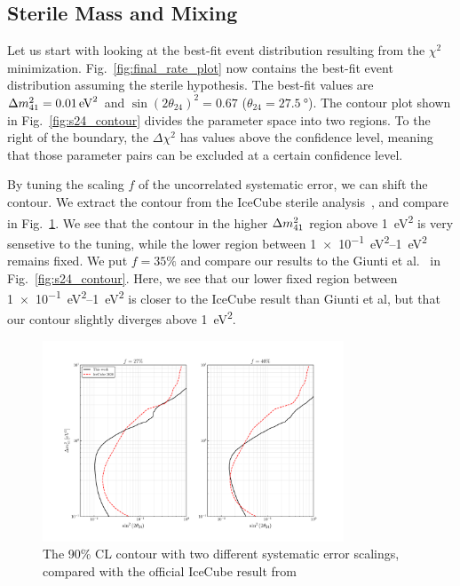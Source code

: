 \subsection{Sterile Mass and Mixing}
Let us start with looking at the best-fit event distribution resulting from the $\chi^2$ minimization.
Fig.~\ref{fig:final_rate_plot} now contains the best-fit event distribution assuming the sterile hypothesis.
The best-fit values are $\dm[41] = \SI{0.01}{\eV\squared}$ and 
$\sin(2\theta_{24})^2 = 0.67$ ($\theta_{24} = \SI{27.5}{\degree}$). %
The contour plot shown in Fig.~\ref{fig:s24_contour} divides the parameter space into two regions.
To the right of the boundary, the $\Delta \chi^2$ has values above the confidence level, meaning that 
those parameter pairs can be excluded at a certain confidence level.

By tuning the scaling $f$ of the uncorrelated systematic error, we can shift the contour. We extract the contour from the 
IceCube sterile analysis~\cite{IC2020}, and compare in Fig.~\ref{fig:error_tuning}. We see that the contour in the 
higher $\dm[41]$ region above \SI{1}{\eV\squared} is very sensetive to the tuning, while the lower region between \SIrange[]{1e-1}{1}{\eV\squared}
remains fixed. We put $f=35\%$ and compare our results to the Giunti et al.~\cite{gariazzoUpdatedGlobalAnalysis2017} in Fig.~\ref{fig:s24_contour}.
Here, we see that our lower fixed region between \SIrange{1e-1}{1}{\eV\squared} is closer to the IceCube result than Giunti et al, but that 
our contour slightly diverges above \SI{1}{\eV\squared}. 
\begin{figure}
    \centering
    \includegraphics[width=0.8\textwidth]{figures/s24_error_tuning.pdf}
    \caption{The 90\% CL contour with two different systematic error scalings, compared 
    with the official IceCube result from~\cite{IC2020}}\label{fig:error_tuning}
\end{figure}

